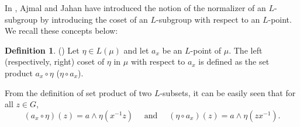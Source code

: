 \documentclass[10pt]{article}
\theoremstyle{plain}
\theoremstyle{definition}
\newtheorem{definition}[theorem]{Definition}
\theoremstyle{remark}
\theoremstyle{case}
\begin{document}
\noindent In \cite{ajmal_nor}, Ajmal and Jahan have introduced the notion of the normalizer of an $L$-subgroup by introducing the coset of an $L$-subgroup with respect to an $L$-point. We recall these concepts below:

\begin{definition}(\cite{ajmal_nor})
	Let $\eta \in L(\mu)$ and let $a_x$ be an $L$-point of $\mu$. The left (respectively, right) coset of $\eta$ in $\mu$ with respect to $a_x$ is defined as the set product $a_x \circ \eta$ ($\eta \circ a_x$).
\end{definition}

\noindent From the definition of set product of two $L$-subsets, it can be easily seen that for all $z \in G$, 
\[ (a_x \circ \eta)(z) = a \wedge \eta(x^{-1}z) \quad \text{ and } \quad (\eta \circ a_x)(z) = a \wedge \eta(zx^{-1}). \]
\end{document}
